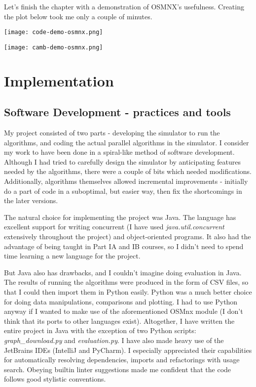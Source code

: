 \documentclass[12pt,a4paper,twoside,openright]{report}
\begin{document}
Let's finish the chapter with a demonstration of OSMNX's usefulness. Creating the plot below took me only a couple of minutes.

\texttt{[image: code-demo-osmnx.png]}
\begin{center}\texttt{[image: camb-demo-osmnx.png]}\end{center}


\chapter{Implementation}

\section{Software Development - practices and tools}
My project consisted of two parts - developing the simulator to run the algorithms, and coding the actual parallel algorithms in the simulator. I consider my work to have been done in a spiral-like method of software development. Although I had tried to carefully design the simulator by anticipating features needed by the algorithms, there were a couple of bits which needed modifications. Additionally, algorithms themselves allowed incremental improvements - initially do a part of code in a suboptimal, but easier way, then fix the shortcomings in the later versions.  

The natural choice for implementing the project was Java. The language has excellent support for writing concurrent (I have used \textit{java.util.concurrent} extensively throughout the project) and object-oriented programs. It also had the advantage of being taught in Part IA and IB courses, so I didn't need to spend time learning a new language for the project.

But Java also has drawbacks, and I couldn't imagine doing evaluation in Java. The results of running the algorithms were produced in the form of CSV files, so that I could then import them in Python easily. Python was a much better choice for doing data manipulations, comparisons and plotting. I had to use Python anyway if I wanted to make use of the aforementioned OSMnx module (I don't think that its ports to other languages exist). Altogether, I have written the entire project in Java with the exception of two Python scripts: \textit{graph\_download.py} and \textit{evaluation.py}. I have also made heavy use of the JetBrains IDEs (IntelliJ and PyCharm). I especially appreciated their capabilities for automatically resolving dependencies, imports and refactorings with usage search. Obeying builtin linter suggestions made me confident that the code follows good stylistic conventions.
\end{document}
